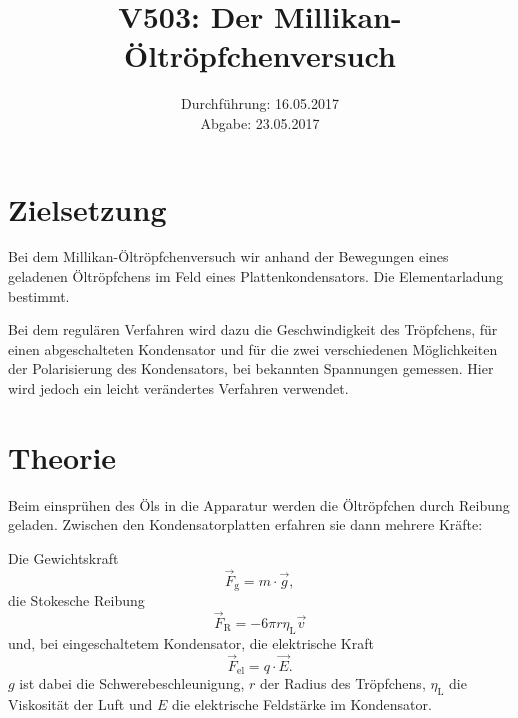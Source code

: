 \documentclass[
  bibliography=totoc,     %
  captions=tableheading,  %
  titlepage=firstiscover, %
]{scrartcl}
\title{V503: Der Millikan-Öltröpfchenversuch}
\author{
  Simon Schulte
  \texorpdfstring{
    \\
    \href{mailto:simon.schulte@udo.edu}{simon.schulte@udo.edu}
  }{}
  \texorpdfstring{\and}{, }
  Tim Sedlaczek
  \texorpdfstring{
    \\
    \href{mailto:tim.sedlaczek@udo.edu}{tim.sedlaczek@udo.edu}
  }{}
}
\date{Durchführung: 16.05.2017\\
      Abgabe: 23.05.2017}
\begin{document}
\maketitle
\thispagestyle{empty}
\tableofcontents
\newpage
\setcounter{page}{1}
\section{Zielsetzung}
\label{sec:zielsetzung}
Bei dem Millikan-Öltröpfchenversuch wir anhand der Bewegungen
eines geladenen Öltröpfchens im Feld eines Plattenkondensators.
Die Elementarladung bestimmt.

\noindent
Bei dem regulären Verfahren wird dazu die Geschwindigkeit des Tröpfchens,
für einen abgeschalteten Kondensator und für die zwei verschiedenen
Möglichkeiten der Polarisierung des Kondensators, bei bekannten Spannungen
gemessen.
Hier wird jedoch ein leicht verändertes Verfahren verwendet.
\section{Theorie}
\label{sec:theorie}
Beim einsprühen des Öls in die Apparatur werden die Öltröpfchen
durch Reibung geladen. Zwischen den Kondensatorplatten
erfahren sie dann mehrere Kräfte:

\noindent
Die Gewichtskraft
\begin{equation}
  \vec{F}_ \mathup{g} = m \cdot \vec{g},
\end{equation}
die Stokesche Reibung
\begin{equation}
  \vec{F}_\mathup{R} = - 6 \pi r \eta_\mathup{L} \vec{v}
\end{equation}
und, bei eingeschaltetem Kondensator, die elektrische Kraft
\begin{equation}
  \vec{F}_\mathup{el} = q \cdot \vec{E}.
\end{equation}
$g$ ist dabei die Schwerebeschleunigung, $r$ der Radius des Tröpfchens, $\eta_\mathup{L}$
die Viskosität der Luft und $E$ die elektrische Feldstärke im Kondensator.
\end{document}
